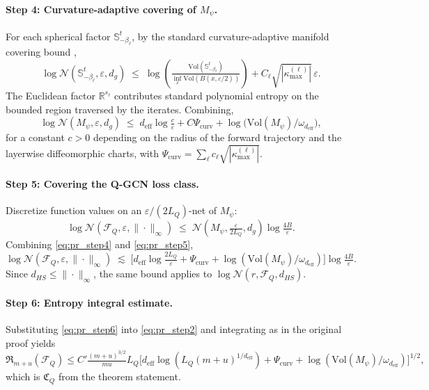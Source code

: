 \documentclass[letterpaper]{article}
\newcommand{\R}{\mathbb{R}}
\begin{document}
\paragraph{Step 4: Curvature-adaptive covering of $M_\psi$.}
For each spherical factor $\mathbb S^t_{-\beta_\ell}$, by the standard
curvature-adaptive manifold covering bound
\cite[e.g.][]{niyogi2008finding},
\[
\log \mathcal N(\mathbb S^t_{-\beta_\ell}, \varepsilon, d_g)
\;\leq\; \log\!\left(\tfrac{\mathrm{Vol}(\mathbb S^t_{-\beta_\ell})}
{\inf_x \mathrm{Vol}(B(x, \varepsilon/2))}\right)
+ C_\ell \sqrt{|\kappa_{\max}^{(\ell)}|}\, \varepsilon.
\]
The Euclidean factor $\R^{s_\ell}$ contributes standard polynomial entropy
on the bounded region traversed by the iterates. Combining,
\begin{equation}
\label{eq:pr_step4}
\log \mathcal N(M_\psi, \varepsilon, d_g)
\;\leq\; d_{\mathrm{eff}} \log\tfrac{c}{\varepsilon} + C \Psi_{\mathrm{curv}}
+ \log\!\big(\mathrm{Vol}(M_\psi)/\omega_{d_{\mathrm{eff}}}\big),
\end{equation}
for a constant $c > 0$ depending on the radius of the forward trajectory
and the layerwise diffeomorphic charts, with $\Psi_{\mathrm{curv}} =
\sum_\ell c_\ell \sqrt{|\kappa_{\max}^{(\ell)}|}$.

\paragraph{Step 5: Covering the Q-GCN loss class.}
Discretize function values on an $\varepsilon/(2L_Q)$-net of $M_\psi$:
\begin{equation}
\label{eq:pr_step5}
\log \mathcal N(\mathcal F_Q, \varepsilon, \|\cdot\|_\infty)
\;\leq\;
\mathcal N(M_\psi, \tfrac{\varepsilon}{2L_Q}, d_g) \log\tfrac{4B}{\varepsilon}.
\end{equation}
Combining \eqref{eq:pr_step4} and \eqref{eq:pr_step5},
\begin{equation}
\label{eq:pr_step6}
\log \mathcal N(\mathcal F_Q, \varepsilon, \|\cdot\|_\infty)
\;\lesssim\;
\Big[ d_{\mathrm{eff}} \log\tfrac{2L_Q}{\varepsilon} + \Psi_{\mathrm{curv}}
+ \log(\mathrm{Vol}(M_\psi)/\omega_{d_{\mathrm{eff}}}) \Big]
\log\tfrac{4B}{\varepsilon}.
\end{equation}
Since $d_{HS} \leq \|\cdot\|_\infty$, the same bound applies to
$\log \mathcal N(r, \mathcal F_Q, d_{HS})$.

\paragraph{Step 6: Entropy integral estimate.}
Substituting \eqref{eq:pr_step6} into \eqref{eq:pr_step2} and integrating
as in the original proof yields
\[
\mathfrak R_{m+u}(\mathcal F_Q) \leq
C' \tfrac{(m+u)^{3/2}}{mu} L_Q
\big[ d_{\mathrm{eff}} \log(L_Q (m+u)^{1/d_{\mathrm{eff}}}) + \Psi_{\mathrm{curv}}
+ \log(\mathrm{Vol}(M_\psi)/\omega_{d_{\mathrm{eff}}}) \big]^{1/2},
\]
which is $\mathfrak C_Q$ from the theorem statement.
\end{document}
